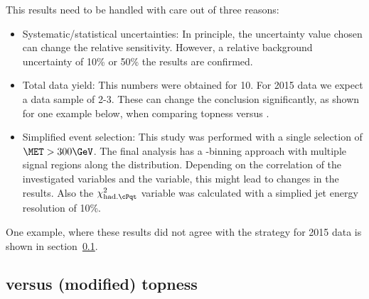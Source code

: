 This results need to be handled with care out of three reasons:
\begin{itemize}
\item Systematic/statistical uncertainties: In principle, the uncertainty value chosen can change the relative sensitivity. However, a relative background uncertainty of 10\% or 50\% the results are confirmed.
\item Total data yield: This numbers were obtained for 10\fbinv. For 2015 data we expect a data sample of 2-3\fbinv. These can change the conclusion significantly, as shown for one example below, when comparing topness versus \MTtW.
\item Simplified event selection: This study was performed with a single \MET selection of $\MET>300\GeV$. The final analysis has a \MET-binning approach with multiple signal regions along the \MET distribution. Depending on the correlation of the investigated variables and the \MET variable, this might lead to changes in the results. Also the $\chi^2_{\mathrm{had.}\cPqt}$ variable was calculated with a simplied jet energy resolution of 10\%.
\end{itemize}

One example, where these results did not agree with the strategy for 2015 data is shown in section~\ref{sec:sigvarstudy:MT2WvsTopness}.

\subsection{\texorpdfstring{\MTtW}{MT2W} versus (modified) topness}
\label{sec:sigvarstudy:MT2WvsTopness}

